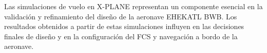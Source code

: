 Las simulaciones de vuelo en X-PLANE representan un componente esencial en la validación y refinamiento del diseño de la aeronave EHEKATL BWB. Los resultados obtenidos a partir de estas simulaciones influyen en las decisiones finales de diseño y en la configuración del FCS y navegación a bordo de la aeronave.













